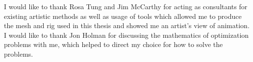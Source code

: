  
I would like to thank Rosa Tung and Jim McCarthy for acting as consultants for existing artistic methods as well as usage of tools which allowed me to produce the mesh and rig used in this thesis and showed me an artist's view of animation.  I would like to thank Jon Holman for discussing the mathematics of optimization problems with me, which helped to direct my choice for how to solve the problems.
